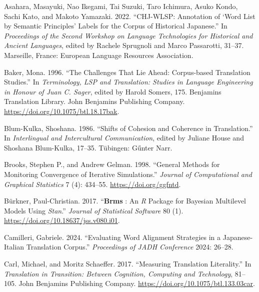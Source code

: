 \documentclass[
  letterpaper,
  DIV=11,
  numbers=noendperiod]{scrartcl}
\newlength{\cslhangindent}
\newenvironment{CSLReferences}[2] %
 {\begin{list}{}{%
  \setlength{\itemindent}{0pt}
  \setlength{\leftmargin}{0pt}
  \setlength{\parsep}{0pt}
  \ifodd #1
   \setlength{\leftmargin}{\cslhangindent}
   \setlength{\itemindent}{-1\cslhangindent}
  \fi
  \setlength{\itemsep}{#2\baselineskip}}}
 {\end{list}}
\begin{document}
\label{refs}
\begin{CSLReferences}{1}{0}
Asahara, Masayuki, Nao Ikegami, Tai Suzuki, Taro Ichimura, Asuko Kondo,
Sachi Kato, and Makoto Yamazaki. 2022. {``{CHJ-WLSP}: {Annotation} of
{`{Word List} by {Semantic Principles}'} {Labels} for the {Corpus} of
{Historical Japanese}.''} In \emph{Proceedings of the {Second Workshop}
on {Language Technologies} for {Historical} and {Ancient Languages}},
edited by Rachele Sprugnoli and Marco Passarotti, 31--37. Marseille,
France: European Language Resources Association.

Baker, Mona. 1996. {``The Challenges That Lie Ahead: {Corpus-based}
Translation Studies.''} In \emph{Terminology, {LSP} and {Translation}:
{Studies} in Language Engineering in Honour of {Juan C}. {Sager}},
edited by Harold Somers, 175. Benjamins {Translation Library}. John
Benjamins Publishing Company.
\url{https://doi.org/10.1075/btl.18.17bak}.

Blum-Kulka, Shoshana. 1986. {``Shifts of {Cohesion} and {Coherence} in
{Translation}.''} In \emph{Interlingual and {Intercultural
Communication}}, edited by Juliane House and Shoshana Blum-Kulka,
17--35. T{ü}bingen: G{ű}nter Narr.

Brooks, Stephen P., and Andrew Gelman. 1998. {``General {Methods} for
{Monitoring Convergence} of {Iterative Simulations}.''} \emph{Journal of
Computational and Graphical Statistics} 7 (4): 434--55.
\url{https://doi.org/ggfntd}.

Bürkner, Paul-Christian. 2017. {``{\textbf{Brms}} : {An} {\emph{R}}
{Package} for {Bayesian Multilevel Models Using} {\emph{Stan}}.''}
\emph{Journal of Statistical Software} 80 (1).
\url{https://doi.org/10.18637/jss.v080.i01}.

Camilleri, Gabriele. 2024. {``Evaluating {Word Alignment Strategies} in
a {Japanese-Italian Translation Corpus}.''} \emph{Proceedings of JADH
Conference} 2024: 26--28.

Carl, Michael, and Moritz Schaeffer. 2017. {``Measuring {Translation
Literality}.''} In \emph{Translation in {Transition}: {Between
Cognition}, {Computing} and {Technology}}, 81--105. John Benjamins
Publishing Company. \url{https://doi.org/10.1075/btl.133.03car}.


\end{CSLReferences}
\end{document}
